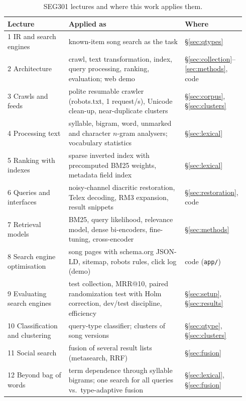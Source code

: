 \documentclass[11pt]{article}
\begin{document}
\begin{table}[h]
\centering\small
\caption{SEG301 lectures and where this work applies them.}\label{tab:seg}
\begin{tabular}{@{}p{0.27\linewidth}p{0.55\linewidth}p{0.12\linewidth}@{}}
\toprule
Lecture & Applied as & Where \\
\midrule
1 IR and search engines & known-item song search as the task & \S\ref{sec:qtypes} \\
2 Architecture & crawl, text transformation, index, query processing, ranking, evaluation; web demo & \S\ref{sec:collection}--\ref{sec:methods}, code \\
3 Crawls and feeds & polite resumable crawler (robots.txt, 1 request/s), Unicode clean-up, near-duplicate clusters & \S\ref{sec:corpus}, \S\ref{sec:clusters} \\
4 Processing text & syllable, bigram, word, unmarked and character $n$-gram analysers; vocabulary statistics & \S\ref{sec:lexical} \\
5 Ranking with indexes & sparse inverted index with precomputed BM25 weights, metadata field index & \S\ref{sec:lexical} \\
6 Queries and interfaces & noisy-channel diacritic restoration, Telex decoding, RM3 expansion, result snippets & \S\ref{sec:restoration}, code \\
7 Retrieval models & BM25, query likelihood, relevance model, dense bi-encoders, fine-tuning, cross-encoder & \S\ref{sec:methods} \\
8 Search engine optimisation & song pages with schema.org JSON-LD, sitemap, robots rules, click log (demo) & code (\texttt{app/}) \\
9 Evaluating search engines & test collection, MRR@10, paired randomization test with Holm correction, dev/test discipline, efficiency & \S\ref{sec:setup}, \S\ref{sec:results} \\
10 Classification and clustering & query-type classifier; clusters of song versions & \S\ref{sec:qtype}, \S\ref{sec:clusters} \\
11 Social search & fusion of several result lists (metasearch, RRF) & \S\ref{sec:fusion} \\
12 Beyond bag of words & term dependence through syllable bigrams; one search for all queries vs.\ type-adaptive fusion & \S\ref{sec:lexical}, \S\ref{sec:fusion} \\
\bottomrule
\end{tabular}
\end{table}
\end{document}
